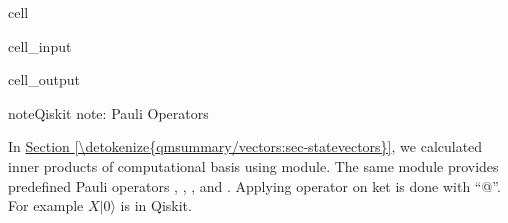 \documentclass[letterpaper,10pt,english]{jupyterBook}
\begin{document}
\begin{sphinxuseclass}{cell}\begin{sphinxVerbatimInput}

\begin{sphinxuseclass}{cell_input}
\begin{sphinxVerbatim}[commandchars=\\\{\}]
  
  
  

   

\end{sphinxVerbatim}

\end{sphinxuseclass}\end{sphinxVerbatimInput}
\begin{sphinxVerbatimOutput}

\begin{sphinxuseclass}{cell_output}
\noindent{}

\end{sphinxuseclass}\end{sphinxVerbatimOutput}

\end{sphinxuseclass}
\begin{sphinxadmonition}{note}{Qiskit note: Pauli Operators}

\sphinxAtStartPar
In \hyperref[\detokenize{qmsummary/vectors:sec-statevectors}]{Section \ref{\detokenize{qmsummary/vectors:sec-statevectors}}}, we calculated inner products of computational basis using  module.  The same module provides predefined Pauli operators  , , , and .   Applying operator on ket is done with “@”.  For example \(X |0\rangle\) is  in Qiskit.

\sphinxAtStartPar
{}
\end{sphinxadmonition}
\end{document}

